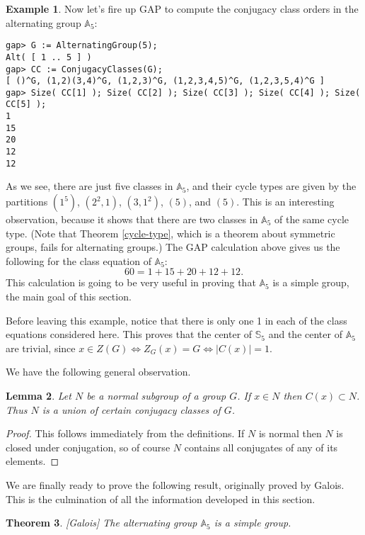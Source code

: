 \documentclass[11pt,oneside]{article}
\newtheorem{thm}{Theorem}[section]
\newtheorem{lem}[thm]{Lemma}
\theoremstyle{definition}
\newtheorem{example}[thm]{Example}
\newcommand{\Sym}{\mathbb{S}}
\newcommand{\Alt}{\mathbb{A}}
\begin{document}
\begin{example}\label{ex:A5}
Now let's fire up GAP to compute the conjugacy class orders in the
alternating group $\Alt_5$:  \tiny
\begin{verbatim}
gap> G := AlternatingGroup(5);
Alt( [ 1 .. 5 ] )
gap> CC := ConjugacyClasses(G);
[ ()^G, (1,2)(3,4)^G, (1,2,3)^G, (1,2,3,4,5)^G, (1,2,3,5,4)^G ]
gap> Size( CC[1] ); Size( CC[2] ); Size( CC[3] ); Size( CC[4] ); Size( CC[5] );
1
15
20
12
12
\end{verbatim}\normalsize
As we see, there are just five classes in $\Alt_5$, and their cycle
types are given by the partitions $(1^5)$, $(2^2,1)$, $(3,1^2)$,
$(5)$, and $(5)$. This is an interesting observation, because it shows
that there are two classes in $\Alt_5$ of the same cycle type. (Note
that Theorem \ref{cycle-type}, which is a theorem about symmetric
groups, fails for alternating groups.) The GAP calculation above gives
us the following for the class equation of $\Alt_5$:
\[
  60 = 1+15+20+12+12.
\]
This calculation is going to be very useful in proving that $\Alt_5$
is a simple group, the main goal of this section.

Before leaving this example, notice that there is only one 1 in each
of the class equations considered here. This proves that the center of
$\Sym_5$ and the center of $\Alt_5$ are trivial, since $x \in Z(G)
\Leftrightarrow Z_G(x)=G \Leftrightarrow |C(x)|=1$. 
\end{example}

We have the following general observation.

\begin{lem} \label{normal-lem}
Let $N$ be a normal subgroup of a group $G$. If $x \in N$ then $C(x)
\subset N$. Thus $N$ is a union of certain conjugacy classes of $G$.
\end{lem}

\begin{proof}
This follows immediately from the definitions. If $N$ is normal then
$N$ is closed under conjugation, so of course $N$ contains all
conjugates of any of its elements. 
\end{proof}

We are finally ready to prove the following result, originally proved
by Galois. This is the culmination of all the information developed in
this section.

\begin{thm}\index{simplicity~of~$\Alt_5$}[Galois] 
The alternating group $\Alt_5$ is a simple group. 
\end{thm}
\end{document}
